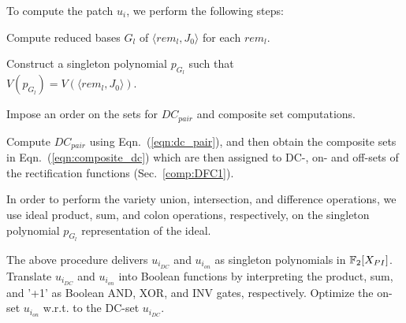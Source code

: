 To compute the patch $u_i$, we perform the following steps:
\bi
\item Compute reduced \Grobner bases $G_l$ of $\langle rem_l, J_0 \rangle$ for each $rem_l$.
\item Construct a singleton polynomial $p_{G_l}$ such that \\ $V(p_{G_l}) = V(\langle rem_l, J_0 \rangle)$.
\item Impose an order on the sets for $DC_{pair}$ and composite set computations.
\item Compute $DC_{pair}$ using Eqn.~(\ref{eqn:dc_pair}), and then obtain the composite sets
      in Eqn.~(\ref{eqn:composite_dc}) which are then assigned to DC-, on- and off-sets of the 
      rectification functions (Sec.~\ref{comp:DFC1}).
\item In order to perform the variety union, intersection, and difference operations, we use ideal 
        product, sum, and colon operations, respectively, on the
        singleton polynomial $p_{G_l}$ representation of the ideal.
\item The above procedure delivers $u_{i_{DC}}$ and $u_{i_{on}}$ as singleton polynomials in ${\mathbb{F}}_{2}[X_{PI}]$.
Translate $u_{i_{DC}}$ and $u_{i_{on}}$ into Boolean functions by interpreting the product, sum,
and '+1' as Boolean AND, XOR, and INV gates, respectively. Optimize the on-set $u_{i_{on}}$ w.r.t. to the DC-set $u_{i_{DC}}$.
\ei





